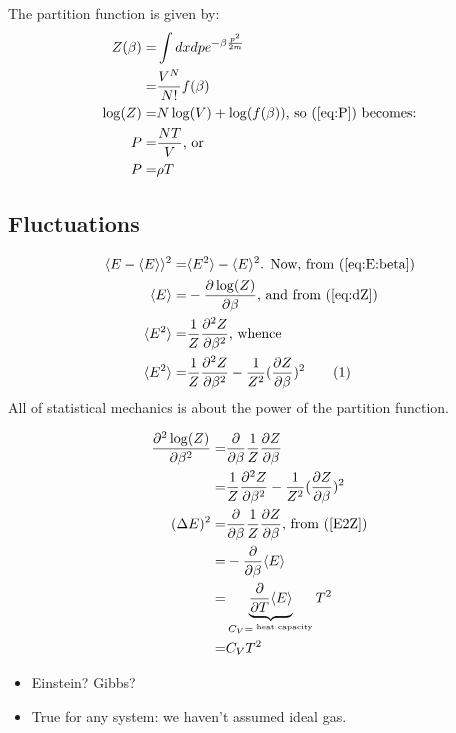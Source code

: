 \documentclass[]{article}
\newcommand\numberthis{\addtocounter{equation}{1}\tag{\theequation}}
\begin{document}
The partition function is given by:
\begin{align*}
Z(\beta) =& \int dx dp e^{- \beta \frac{p^2}{2m}}\\
=& \frac{V^N}{N!} f(\beta)\\
\log(Z) =& N \log(V) + \log(f(\beta))\text{, so (\ref{eq:P})  becomes:}\\
P =& \frac{NT}{V}\text{, or}\\
P =& \rho T
\end{align*}

\subsection{Fluctuations}

\begin{align*}
	\langle E -  \langle E \rangle \rangle^2 =& \langle E^2 \rangle - \langle E \rangle^2\text{. Now, from (\ref{eq:E:beta})}\\
	\langle E \rangle=& - \frac{\partial \log(Z)}{\partial \beta}\text{, and from (\ref{eq:dZ})}\\
	 \langle E^2 \rangle =& \frac{1}{Z} \frac{\partial^2 Z}{\partial \beta^2} \text{, whence}\\
	 \langle E^2 \rangle =& \frac{1}{Z} \frac{\partial^2 Z}{\partial \beta^2} - \frac{1}{Z^2} (\frac{\partial Z}{\partial \beta})^2 \numberthis \label{E2Z}
\end{align*}
All of statistical mechanics is about the power of the partition function.

\begin{align*}
	\frac{\partial^2 \log(Z)}{\partial \beta^2} =& \frac{\partial}{\partial \beta} \frac{1}{Z} \frac{\partial Z}{\partial \beta}\\
	=& \frac{1}{Z} \frac{\partial^2 Z}{\partial \beta^2} - \frac{1}{Z^2} (\frac{\partial Z}{\partial \beta})^2\\
	(\Delta E)^2 =& \frac{\partial}{\partial \beta} \frac{1}{Z} \frac{\partial Z}{\partial \beta}\text{, from (\ref{E2Z})}\\
	=& - \frac{\partial}{\partial \beta} \langle E \rangle\\
	=&  \underbrace{\frac{\partial}{\partial T} \langle E \rangle}_{C_V=^\text{ heat capacity}} T^2\\
	=& C_V T^2
\end{align*}

\begin{itemize}
	\item Einstein? Gibbs?
	\item True for any system: we haven't assumed ideal gas.
\end{itemize}
\end{document}
